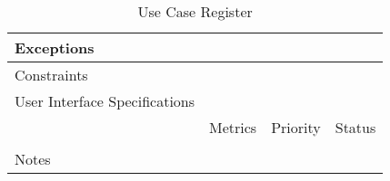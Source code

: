 \begin{table}[H]
\begin{tabularx}{\linewidth}{|l|X|X|X|}
    \hline Exceptions                    & \multicolumn{3}{l|}{}                                                                                 \\

    \hline Constraints                   & \multicolumn{3}{l|}{}                                                                                 \\

    \hline User Interface Specifications & \multicolumn{3}{l|}{}                                                                                 \\

    \hline \multirow{2}{*}{}             & Metrics                                                                           & Priority & Status \\
    \cline{2-4}                          &                                                                                   &          &        \\
    \hline Notes                         & \multicolumn{3}{l|}{}                                                                                 \\
    \hline
  \end{tabularx}
  \caption{Use Case Register}
  \label{tab:use_case_register}
\end{table}

